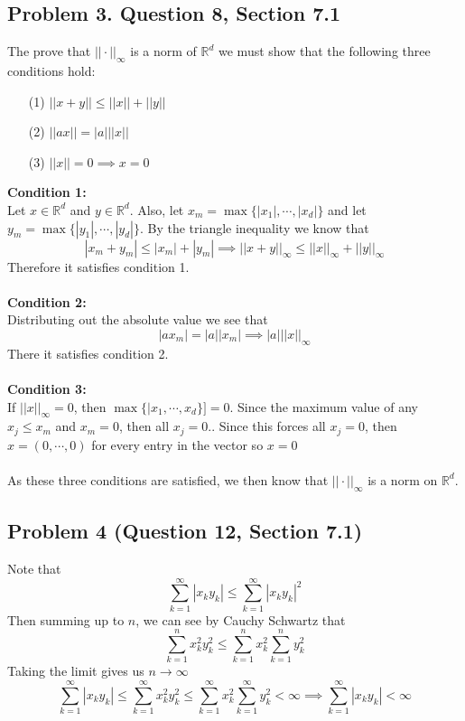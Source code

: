 \documentclass{article}
\begin{document}
\subsection*{Problem 3. Question 8, Section 7.1}
The prove that $||\cdot ||_\infty$ is a norm of $\mathbb{R}^d$ we must show that the following three conditions hold:
\begin{itemize}
	\item[(1)] $||x+y|| \leq ||x|| + ||y||$
	\item[(2)] $||ax||  = |a|||x||$
	\item[(3)] $ ||x|| = 0 \implies x=0$
\end{itemize}
\textbf{Condition 1:}\\
Let $x\in\mathbb{R}^d$ and $y\in\mathbb{R}^d$. Also, let $x_m = \max\{|x_1|, \dotsm, |x_d|\}$ and let $y_m = \max\{|y_1|, \dotsm, |y_d|\}$. By the triangle inequality we know that
\[
|x_m + y_m|  \leq |x_m| + |y_m| \implies ||x+y||_\infty \leq ||x||_\infty + ||y||_\infty
\]
Therefore it satisfies condition 1.
\pagebreak
\\\\\textbf{Condition 2:} \\
Distributing out the absolute value we see that
\[
|ax_m| = |a||x_m| \implies |a|||x||_\infty
\]
There it satisfies condition 2.
\\\\\textbf{Condition 3:}\\
If $||x||_\infty = 0$, then $\max\{ |x_1, \dotsm, x_d\}] = 0$. Since the maximum value of any $x_j \leq x_m$ and $x_m=0$, then all $x_j=0.$. Since this forces all $x_j =0$, then $x=(0, \dotsm, 0)$ for every entry in the vector so $x=0$
\\\\
As these three conditions are satisfied, we then know that $||\cdot||_\infty$ is a norm on $\mathbb{R}^d$.

\subsection*{Problem 4 (Question 12, Section 7.1)}
Note that
\[
\sum_{k=1}^{\infty} |x_ky_k| \leq\sum_{k=1}^{\infty} |x_ky_k|^2
\]
Then summing up to $n$, we can see by Cauchy Schwartz that
\[
\sum_{k=1}^{n} x_k^2 y_k^2  \leq \sum_{k=1}^{n} x_k^2\sum_{k=1}^{n} y_k^2
\]
Taking the limit gives us $n\to\infty$
\[
\sum_{k=1}^{\infty} |x_ky_k| \leq \sum_{k=1}^{\infty} x_k^2 y_k^2  \leq \sum_{k=1}^{\infty} x_k^2\sum_{k=1}^{\infty} y_k^2 < \infty \implies \sum_{k=1}^{\infty} |x_ky_k| < \infty
\]
\end{document}
